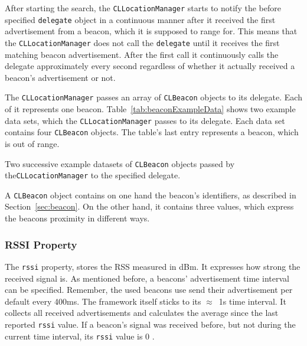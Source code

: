 After starting the search, the \texttt{CLLocationManager} starts to notify the before specified \texttt{delegate} object in a continuous manner after it received the first advertisement from a beacon, which it is supposed to range for. This means that the \texttt{CLLocationManager} does not call the \texttt{delegate} until it receives the first matching beacon advertisement. After the first call it continuously calls the delegate approximately every second regardless of whether it actually received a beacon's advertisement or not.

The \texttt{CLLocationManager} passes an array of \texttt{CLBeacon} objects to its delegate. Each of it represents one beacon. Table~\ref{tab:beaconExampleData} shows two example data sets, which the \texttt{CLLocationManager} passes to its delegate. Each data set contains four \texttt{CLBeacon} objects. The table's last entry represents a beacon, which is out of range.

\begin{table}
	
	\caption{Two successive example datasets of \texttt{CLBeacon} objects passed by the\texttt{CLLocationManager} to the specified delegate.}
	\label{tab:beaconExampleData}
\end{table}

A \texttt{CLBeacon} object contains on one hand the beacon's identifiers, as described in Section~\ref{sec:beacon}. On the other hand, it contains three values, which express the beacons proximity in different ways.

\subsubsection*{\acs{RSSI} Property}
The \texttt{rssi} property, stores the \acl{RSS} measured in dBm. It expresses how strong the received signal is. As mentioned before, a beacons' advertisement time interval can be specified. Remember, the used beacons use send their advertisement per default every 400ms. The framework itself sticks to its $\approx$~1s time interval. It collects all received advertisements and calculates the average since the last reported \texttt{rssi} value. If a beacon's signal was received before, but not during the current time interval, its \texttt{rssi} value is 0 \citep{apple:wwdc_2013_bruins,apple:ios_doc_cl}.

